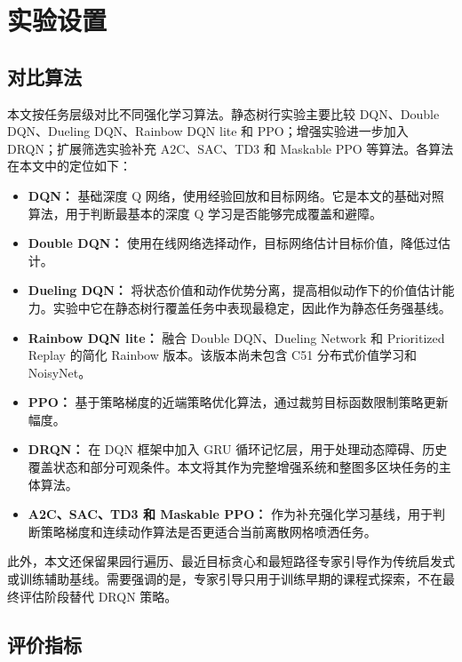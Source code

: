 \documentclass[UTF8]{ctexart}
\begin{document}
\section{实验设置}

\subsection{对比算法}

本文按任务层级对比不同强化学习算法。静态树行实验主要比较 DQN、Double DQN、Dueling DQN、Rainbow DQN lite 和 PPO；增强实验进一步加入 DRQN；扩展筛选实验补充 A2C、SAC、TD3 和 Maskable PPO 等算法。各算法在本文中的定位如下：
\begin{itemize}
  \item \textbf{DQN：} 基础深度 Q 网络，使用经验回放和目标网络。它是本文的基础对照算法，用于判断最基本的深度 Q 学习是否能够完成覆盖和避障。
  \item \textbf{Double DQN：} 使用在线网络选择动作，目标网络估计目标价值，降低过估计。
  \item \textbf{Dueling DQN：} 将状态价值和动作优势分离，提高相似动作下的价值估计能力。实验中它在静态树行覆盖任务中表现最稳定，因此作为静态任务强基线。
  \item \textbf{Rainbow DQN lite：} 融合 Double DQN、Dueling Network 和 Prioritized Replay 的简化 Rainbow 版本。该版本尚未包含 C51 分布式价值学习和 NoisyNet。
  \item \textbf{PPO：} 基于策略梯度的近端策略优化算法，通过裁剪目标函数限制策略更新幅度。
  \item \textbf{DRQN：} 在 DQN 框架中加入 GRU 循环记忆层，用于处理动态障碍、历史覆盖状态和部分可观条件。本文将其作为完整增强系统和整图多区块任务的主体算法。
  \item \textbf{A2C、SAC、TD3 和 Maskable PPO：} 作为补充强化学习基线，用于判断策略梯度和连续动作算法是否更适合当前离散网格喷洒任务。
\end{itemize}

此外，本文还保留果园行遍历、最近目标贪心和最短路径专家引导作为传统启发式或训练辅助基线。需要强调的是，专家引导只用于训练早期的课程式探索，不在最终评估阶段替代 DRQN 策略。

\subsection{评价指标}
\end{document}

